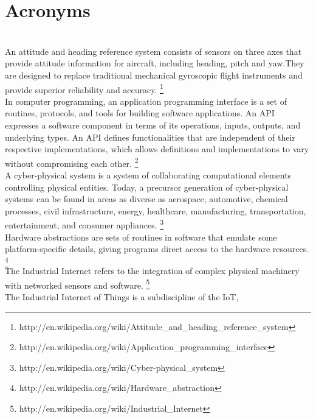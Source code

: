 \section{Acronyms}
\label{acronyms}

\begin{acronym}
	\\
		An attitude and heading reference system consists of sensors on
		three axes that provide attitude information for aircraft, including
		heading, pitch and yaw.They are designed to replace traditional
		mechanical gyroscopic flight instruments and provide superior
		reliability and accuracy.
		\footnote{http://en.wikipedia.org/wiki/Attitude\_and\_heading\_reference\_system}
	\\
		In computer programming, an application programming interface is a set
		of routines, protocols, and tools for building software applications.
		An API expresses a software component in terms of its operations,
		inputs, outputs, and underlying types. An API defines functionalities
		that are independent of their respective implementations, which allows
		definitions and implementations to vary without compromising each
		other.
		\footnote{http://en.wikipedia.org/wiki/Application\_programming\_interface}
	\\
		A cyber-physical system is a system of collaborating computational
		elements controlling physical entities. Today, a precursor generation
		of cyber-physical systems can be found in areas as diverse as
		aerospace, automotive, chemical processes, civil infrastructure,
		energy, healthcare, manufacturing, transportation, entertainment, and
		consumer appliances.
		\footnote{http://en.wikipedia.org/wiki/Cyber-physical\_system}
	\\
		Hardware abstractions are sets of routines in software that emulate
		some platform-specific details, giving programs direct access to the
		hardware resources.
		\footnote{http://en.wikipedia.org/wiki/Hardware\_abstraction}
	\\
		The Industrial Internet refers to the integration of complex physical
		machinery with networked sensors and software.
		\footnote{http://en.wikipedia.org/wiki/Industrial\_Internet}
	\\
		The Industrial Internet of Things is a subdiscipline of the \acs{IoT},

\end{acronym}
